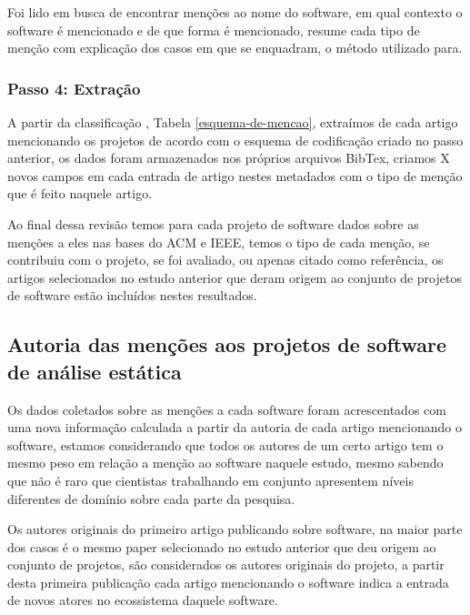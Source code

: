 Foi lido em busca de encontrar menções ao nome do software, em qual contexto o
software é mencionado e de que forma é mencionado, resume cada tipo de menção com explicação dos casos em
que se enquadram, o método utilizado para.

\subsubsection{Passo 4: Extração}

A partir da classificação , Tabela \ref{esquema-de-mencao}, extraímos de cada
artigo mencionando os projetos de acordo com o esquema de codificação criado no
passo anterior, os dados foram armazenados nos próprios arquivos BibTex,
criamos X novos campos em cada entrada de artigo nestes metadados com o tipo de
menção que é feito naquele artigo.

Ao final dessa revisão temos para cada projeto de software dados sobre as
menções a eles nas bases do ACM e IEEE, temos o tipo de cada menção, se
contribuiu com o projeto, se foi avaliado, ou apenas citado como referência, os
artigos selecionados no estudo anterior que deram origem ao conjunto de
projetos de software estão incluídos nestes resultados.

\subsection{Autoria das menções aos projetos de software de análise estática}


Os dados coletados sobre as menções a cada software foram acrescentados com uma
nova informação calculada a partir da autoria de cada artigo mencionando o
software, estamos considerando que todos os autores de um certo artigo tem o
mesmo peso em relação a menção ao software naquele estudo, mesmo sabendo que não
é raro que cientistas trabalhando em conjunto apresentem níveis diferentes de
domínio sobre cada parte da pesquisa.

Os autores originais do primeiro artigo publicando sobre software, na maior
parte dos casos é o mesmo paper selecionado no estudo anterior que deu origem
ao conjunto de projetos, são considerados os autores originais do projeto, a
partir desta primeira publicação cada artigo mencionando o software indica a
entrada de novos atores no ecossistema daquele software.

